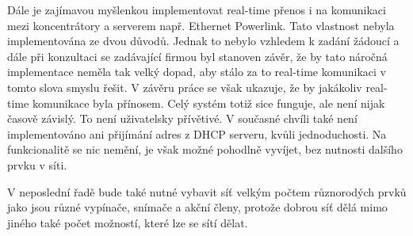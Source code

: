 Dále je zajímavou myšlenkou implementovat real-time přenos i na komunikaci mezi koncentrátory a serverem např. Ethernet Powerlink.  Tato vlastnost nebyla implementována ze dvou důvodů. Jednak to nebylo vzhledem k zadání žádoucí a dále při konzultaci se zadávající firmou byl stanoven závěr, že by tato náročná implementace neměla tak velký dopad, aby stálo za to real-time komunikaci v tomto slova smyslu řešit. V závěru práce se však ukazuje, že by jakákoliv real-time komunikace byla přínosem. Celý systém totiž sice funguje, ale není nijak časově závislý. To není uživatelsky přívětivé. V současné chvíli také není implementováno ani přijímání adres z DHCP serveru, kvůli jednoduchosti. Na funkcionalitě se nic nemění, je však možné pohodlně vyvíjet, bez nutnosti dalšího prvku v síti.

V neposlední řadě bude také nutné vybavit síť velkým počtem růz\-no\-ro\-dých prvků jako jsou různé vypínače, snímače a akční členy, protože dobrou síť dělá mimo jiného také počet možností, které lze se sítí dělat.
